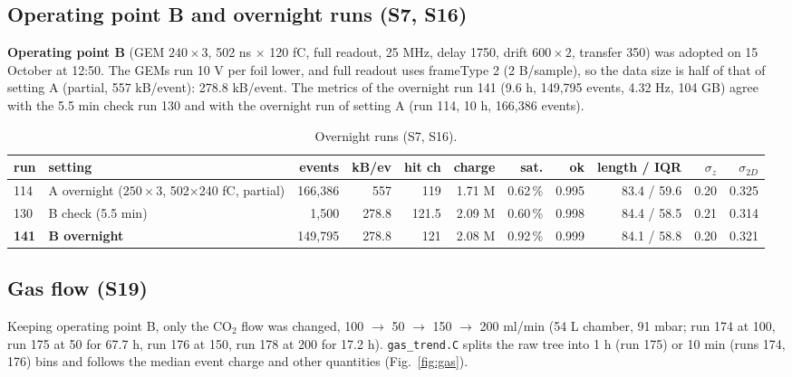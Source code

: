 \documentclass[a4paper,11pt]{article}
\begin{document}
\subsection{Operating point B and overnight runs (S7, S16)}
\textbf{Operating point B} (GEM $240 \times 3$, 502 ns $\times$ 120 fC, full readout, 25 MHz, delay 1750, drift $600 \times 2$, transfer 350) was adopted on 15 October at 12:50.
The GEMs run 10 V per foil lower, and full readout uses frameType 2 (2 B/sample), so the data size is half of that of setting A (partial, 557 kB/event): 278.8 kB/event.
The metrics of the overnight run 141 (9.6 h, 149,795 events, 4.32 Hz, 104 GB) agree with the 5.5 min check run 130 and with the overnight run of setting A (run 114, 10 h, 166,386 events).

\begin{table}[H]\centering\small
\caption{Overnight runs (S7, S16).}
\scriptsize\setlength{\tabcolsep}{3pt}
\begin{tabular}{llrrrrrrrrr}
\toprule
run & setting & events & kB/ev & hit ch & charge & sat. & ok & length / IQR & $\sigma_z$ & $\sigma_{2D}$ \\
\midrule
114 & A overnight ($250{\times}3$, 502${\times}$240 fC, partial) & 166,386 & 557 & 119 & 1.71 M & 0.62\,\% & 0.995 & 83.4 / 59.6 & 0.20 & 0.325 \\
130 & B check (5.5 min) & 1,500 & 278.8 & 121.5 & 2.09 M & 0.60\,\% & 0.998 & 84.4 / 58.5 & 0.21 & 0.314 \\
\textbf{141} & \textbf{B overnight} & 149,795 & 278.8 & 121 & 2.08 M & 0.92\,\% & 0.999 & 84.1 / 58.8 & 0.20 & 0.321 \\
\bottomrule
\end{tabular}
\end{table}

\subsection{Gas flow (S19)}
Keeping operating point B, only the CO$_2$ flow was changed, 100 $\to$ 50 $\to$ 150 $\to$ 200 ml/min (54 L chamber, 91 mbar; run 174 at 100, run 175 at 50 for 67.7 h, run 176 at 150, run 178 at 200 for 17.2 h).
\texttt{gas\_trend.C} splits the raw tree into 1 h (run 175) or 10 min (runs 174, 176) bins and follows the median event charge and other quantities (Fig.~\ref{fig:gas}).
\end{document}
